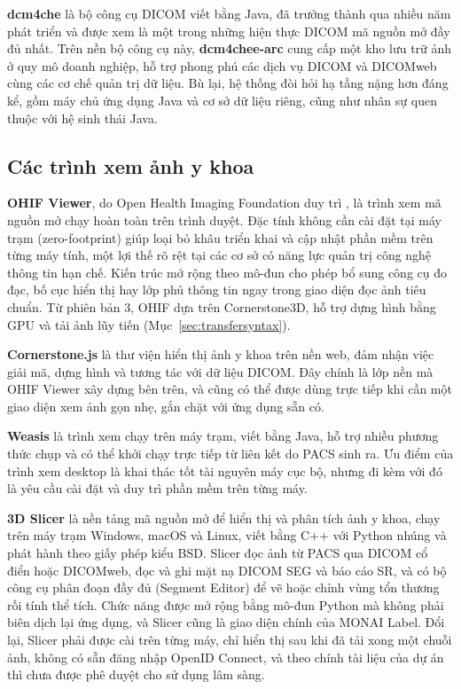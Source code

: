 \textbf{dcm4che} là bộ công cụ DICOM viết bằng Java, đã trưởng thành qua nhiều
năm phát triển và được xem là một trong những hiện thực DICOM mã nguồn mở đầy đủ
nhất. Trên nền bộ công cụ này, \textbf{dcm4chee-arc} cung cấp một kho lưu trữ ảnh
ở quy mô doanh nghiệp, hỗ trợ phong phú các dịch vụ DICOM và DICOMweb cùng các
cơ chế quản trị dữ liệu. Bù lại, hệ thống đòi hỏi hạ tầng nặng hơn đáng kể, gồm
máy chủ ứng dụng Java và cơ sở dữ liệu riêng, cũng như nhân sự quen thuộc với hệ
sinh thái Java.

\subsection{Các trình xem ảnh y khoa}

\textbf{OHIF Viewer}, do Open Health Imaging Foundation duy trì \cite{ziegler2020ohif}, là trình xem mã
nguồn mở chạy hoàn toàn trên trình duyệt. Đặc tính không cần cài đặt tại máy
trạm (zero-footprint) giúp loại bỏ khâu triển khai và cập nhật phần mềm trên
từng máy tính, một lợi thế rõ rệt tại các cơ sở có năng lực quản trị công nghệ
thông tin hạn chế. Kiến trúc mở rộng theo mô-đun cho phép bổ sung công cụ đo
đạc, bố cục hiển thị hay lớp phủ thông tin ngay trong giao diện đọc ảnh tiêu
chuẩn. Từ phiên bản 3, OHIF dựa trên Cornerstone3D, hỗ trợ dựng hình bằng GPU và tải
ảnh lũy tiến (Mục~\ref{sec:transfersyntax}).

\textbf{Cornerstone.js} là thư viện hiển thị ảnh y khoa trên nền web, đảm nhận
việc giải mã, dựng hình và tương tác với dữ liệu DICOM. Đây chính là lớp nền mà
OHIF Viewer xây dựng bên trên, và cũng có thể được dùng trực tiếp khi cần một
giao diện xem ảnh gọn nhẹ, gắn chặt với ứng dụng sẵn có.

\textbf{Weasis} là trình xem chạy trên máy trạm, viết bằng Java, hỗ trợ nhiều
phương thức chụp và có thể khởi chạy trực tiếp từ liên kết do PACS sinh ra. Ưu
điểm của trình xem desktop là khai thác tốt tài nguyên máy cục bộ, nhưng đi kèm
với đó là yêu cầu cài đặt và duy trì phần mềm trên từng máy.

\textbf{3D Slicer} \cite{fedorov2012slicer} là nền tảng mã nguồn mở để hiển thị và
phân tích ảnh y khoa, chạy trên máy trạm Windows, macOS và Linux, viết bằng C++ với
Python nhúng và phát hành theo giấy phép kiểu BSD. Slicer đọc ảnh từ PACS qua DICOM cổ
điển hoặc DICOMweb, đọc và ghi mặt nạ DICOM SEG và báo cáo SR, và có bộ công cụ phân
đoạn đầy đủ (Segment Editor) để vẽ hoặc chỉnh vùng tổn thương rồi tính thể tích. Chức
năng được mở rộng bằng mô-đun Python mà không phải biên dịch lại ứng dụng, và Slicer
cũng là giao diện chính của MONAI Label. Đổi lại, Slicer phải được cài trên từng máy,
chỉ hiển thị sau khi đã tải xong một chuỗi ảnh, không có sẵn đăng nhập OpenID Connect,
và theo chính tài liệu của dự án thì chưa được phê duyệt cho sử dụng lâm sàng.

